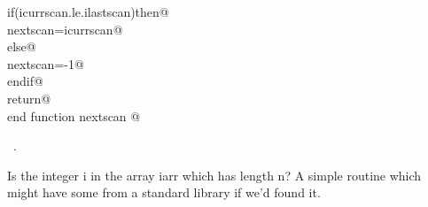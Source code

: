 \documentclass[10pt,a4paper,notitlepage]{article}
\begin{document}
\begin{flushleft}
\begin{minipage}{\linewidth}
\begin{list}{}{}
\mbox{}\verb@      if(icurrscan.le.ilastscan)then@\\
\mbox{}\verb@         nextscan=icurrscan@\\
\mbox{}\verb@      else@\\
\mbox{}\verb@         nextscan=-1@\\
\mbox{}\verb@      endif@\\
\mbox{}\verb@      return@\\
\mbox{}\verb@      end function nextscan                                                  @{\NWsep}
\end{list}
\vspace{-1.5ex}
\footnotesize
\begin{list}{}{\setlength{\itemsep}{-\parsep}\setlength{\itemindent}{-\leftmargin}}
\item \NWtxtMacroRefIn\ .

\item{}
\end{list}
\end{minipage}\vspace{4ex}
\end{flushleft}
Is the integer i in the array iarr which has length n? A simple routine
which might have some from a standard library if we'd found it.
\end{document}
